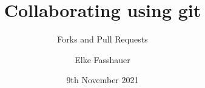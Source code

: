 \documentclass[xcolor=dvipsnames]{beamer}
\begin{document}
 

\title[]
{Collaborating using git}
\subtitle{Forks and Pull Requests}
\author[E. Fasshauer]{Elke Fasshauer}
\date[9.11.21]{9th November 2021}


\begin{frame}
\titlepage
\end{frame}

%










%
%
%
%
%
%
%
%
%
\end{document}
